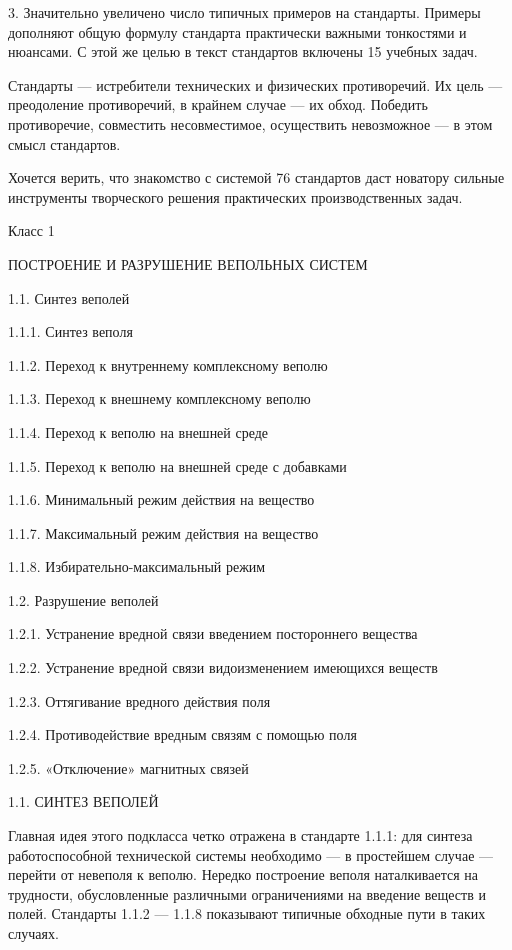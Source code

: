 3. Значительно увеличено число типичных примеров на стандарты. Примеры
дополняют  общую формулу  стандарта практически  важными тонкостями  и
нюансами.  С этой  же целью  в  текст стандартов  включены 15  учебных
задач.

Стандарты — истребители технических и физических противоречий. Их цель
—  преодоление противоречий,  в крайнем  случае —  их обход.  Победить
противоречие,  совместить несовместимое,  осуществить невозможное  — в
этом смысл стандартов.

Хочется верить, что знакомство с  системой 76 стандартов даст новатору
сильные инструменты творческого  решения практических производственных
задач.


Класс 1

ПОСТРОЕНИЕ И РАЗРУШЕНИЕ ВЕПОЛЬНЫХ СИСТЕМ

1.1. Синтез веполей

1.1.1. Синтез веполя

1.1.2. Переход к внутреннему комплексному веполю

1.1.3. Переход к внешнему комплексному веполю

1.1.4. Переход к веполю на внешней среде

1.1.5. Переход к веполю на внешней среде с добавками

1.1.6. Минимальный режим действия на вещество

1.1.7. Максимальный режим действия на вещество

1.1.8. Избирательно-максимальный режим

1.2. Разрушение веполей

1.2.1. Устранение вредной связи введением постороннего
вещества

1.2.2. Устранение вредной связи видоизменением имеющихся веществ

1.2.3. Оттягивание вредного действия поля

1.2.4. Противодействие вредным связям с помощью поля

1.2.5. «Отключение» магнитных связей


1.1. СИНТЕЗ ВЕПОЛЕЙ

Главная идея  этого подкласса  четко отражена  в стандарте  1.1.1: для
синтеза работоспособной технической системы  необходимо — в простейшем
случае  — перейти  от  невеполя к  веполю.  Нередко построение  веполя
наталкивается на трудности,  обусловленные различными ограничениями на
введение веществ и полей. Стандарты  1.1.2 — 1.1.8 показывают типичные
обходные пути в таких случаях.

